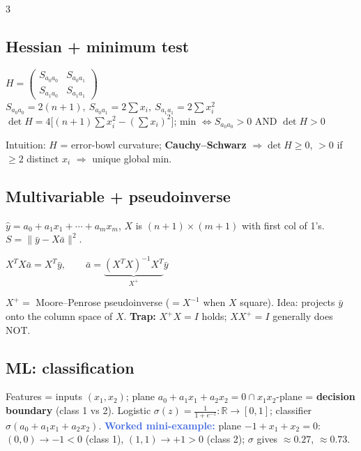 \documentclass[9pt]{extarticle}
\newcommand{\hl}[1]{\textbf{\textcolor{BrickRed}{#1}}}
\newcommand{\ex}[1]{\textbf{\textcolor{RoyalBlue}{#1}}}
\begin{document}
\begin{multicols}{3}
\begin{sloppypar}
\subsection{Hessian + minimum test}
\begin{kbox}
\centering
$H=\left(\begin{smallmatrix}S_{a_0a_0}&S_{a_0a_1}\\S_{a_1a_0}&S_{a_1a_1}\end{smallmatrix}\right)$\\[-2pt]
$\displaystyle S_{a_0a_0}=2(n{+}1),\ S_{a_0a_1}=2\sum x_i,\ S_{a_1a_1}=2\sum x_i^2$\\[1pt]
$\displaystyle \det H=4\big[(n{+}1)\sum x_i^2-(\sum x_i)^2\big]$; min $\iff S_{a_0a_0}>0$ AND $\det H>0$
\end{kbox}
Intuition: $H$ = error-bowl curvature; \textbf{Cauchy--Schwarz} $\Rightarrow\det H\ge0$, $>0$ if $\ge2$ distinct $x_i$ $\Rightarrow$ unique global min.

\subsection{Multivariable + pseudoinverse}
$\hat y=a_0+a_1x_1+\cdots+a_mx_m$, $X$ is $(n{+}1)\times(m{+}1)$ with first col of 1's. $S=\|\bar y-X\bar a\|^2$.
\begin{kbox}
\centering
$\displaystyle X^TX\bar a=X^T\bar y,\qquad \bar a=\underbrace{(X^TX)^{-1}X^T}_{X^+}\bar y$
\end{kbox}
$X^+=$ Moore--Penrose pseudoinverse ($=X^{-1}$ when $X$ square). Idea: projects $\bar y$ onto the column space of $X$. \hl{Trap:} $X^+X=I$ holds; $XX^+=I$ generally does NOT.

\subsection{ML: classification}
Features = inputs $(x_1,x_2)$; plane $a_0+a_1x_1+a_2x_2=0\cap x_1x_2$-plane = \hl{decision boundary} (class 1 vs 2). Logistic $\sigma(z)=\tfrac1{1+e^{-z}}: \mathbb R\to[0,1]$; classifier $\sigma(a_0+a_1x_1+a_2x_2)$. \ex{Worked mini-example:} plane $-1+x_1+x_2=0$: $(0,0)\to-1<0$ (class 1), $(1,1)\to+1>0$ (class 2); $\sigma$ gives $\approx0.27$, $\approx0.73$.
\end{sloppypar}


\end{multicols}
\end{document}

